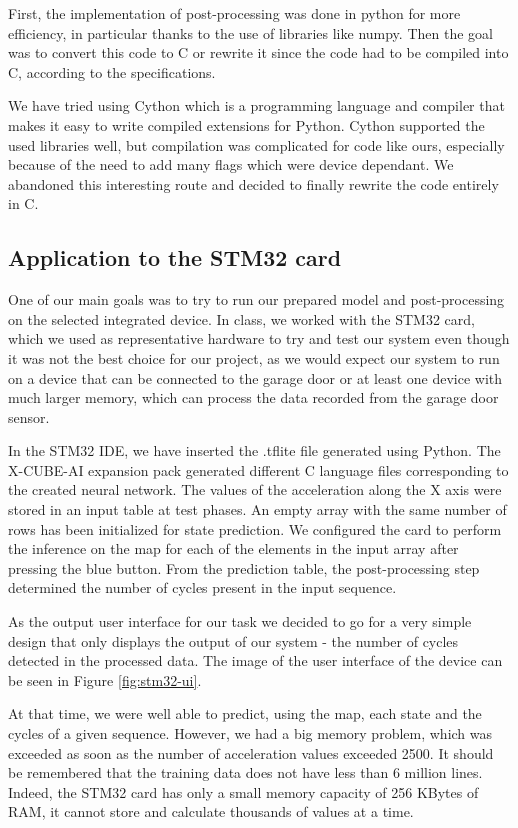 \documentclass[12pt, letterpaper]{article}
\begin{document}
First, the implementation of post-processing was done in python for more efficiency, in particular thanks to the use of libraries like numpy. Then the goal was to convert this code to C or rewrite it since the code had to be compiled into C, according to the specifications.

We have tried using Cython which is a programming language and compiler that makes it easy to write compiled extensions for Python. Cython supported the used libraries well, but compilation was complicated for code like ours, especially because of the need to add many flags which were device dependant. We abandoned this interesting route and decided to finally rewrite the code entirely in C.

\subsection{Application to the STM32 card}
One of our main goals was to try to run our prepared model and post-processing on the selected integrated device. In class, we worked with the STM32 card, which we used as representative hardware to try and test our system even though it was not the best choice for our project, as we would expect our system to run on a device that can be connected to the garage door or at least one device with much larger memory, which can process the data recorded from the garage door sensor.

In the STM32 IDE, we have inserted the .tflite file generated using Python. The X-CUBE-AI expansion pack generated different C language files corresponding to the created neural network. The values of the acceleration along the X axis were stored in an input table at test phases. An empty array with the same number of rows has been initialized for state prediction. We configured the card to perform the inference on the map for each of the elements in the input array after pressing the blue button. From the prediction table, the post-processing step determined the number of cycles present in the input sequence.

As the output user interface for our task we decided to go for a very simple design that only displays the output of our system - the number of cycles detected in the processed data. The image of the user interface of the device can be seen in Figure \ref{fig:stm32-ui}.

At that time, we were well able to predict, using the map, each state and the cycles of a given sequence. However, we had a big memory problem, which was exceeded as soon as the number of acceleration values exceeded 2500. It should be remembered that the training data does not have less than 6 million lines. Indeed, the STM32 card has only a small memory capacity of 256 KBytes of RAM, it cannot store and calculate thousands of values at a time.
\end{document}
